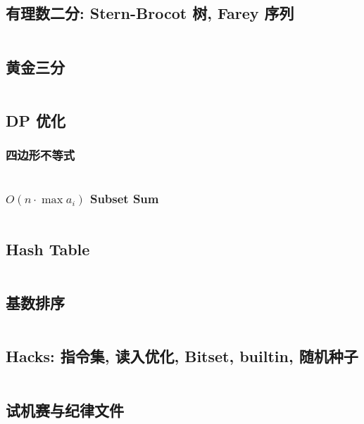 \documentclass[titlepage, a4paper]{article}
\begin{document}
\begin{multicols}{2}
\begin{spacing}{0.6}
				\subsection{有理数二分: Stern-Brocot 树, Farey 序列}
					\inputminted{python}{src/yzh/farey.py}
				\subsection{黄金三分}
					\inputminted[highlightlines={7}]{cpp}{src/yzh/golden_ternary.cpp}
				\subsection{DP 优化}
				\subsubsection{四边形不等式}
					\inputminted{cpp}{src/Miscellany/2D1D.cpp}
					
				\subsubsection{\texorpdfstring{$O(n \cdot \max a_i)$ Subset Sum}{O(n max ai) Subset Sum}  }
					\inputminted{cpp}{src/yzh/Subset Sum.cpp}

				\subsection{Hash Table}
					\inputminted[highlightlines={4,15,17,18}]{cpp}{src/DataStructure/hashmap.cpp}
				\subsection{基数排序}
					\inputminted{cpp}{src/Miscellany/RadixSort.cpp}
				\subsection{Hacks: 指令集, 读入优化, Bitset, builtin, 随机种子}
					\inputminted[highlightlines={2,4,11,13,17}]{cpp}{src/Miscellany/hack.cpp}
				\subsection{试机赛与纪律文件}
				\begin{spacing}{0.3}
					
				\end{spacing}

\end{spacing}
\end{multicols}
\end{document}
